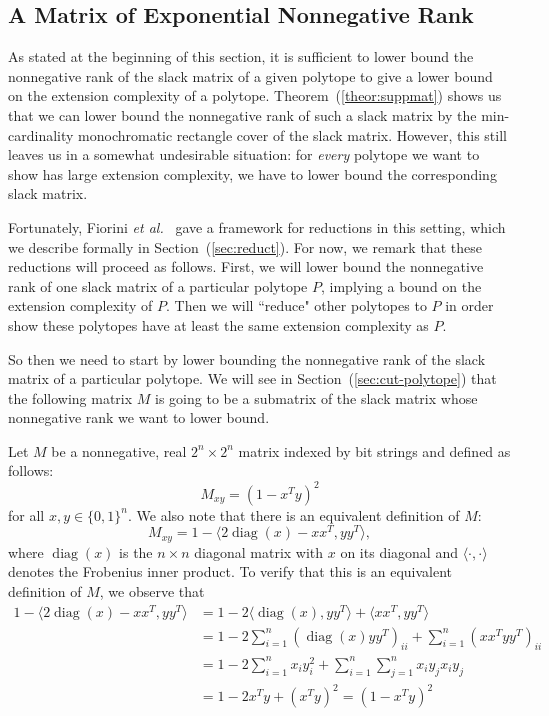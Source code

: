 \documentclass{article}
\makeatletter
\theoremstyle{definition}
\theoremstyle{remark}
\newcommand{\cetal}{\textit{et al.\@}}  %
\newcommand{\rank}{\operatorname{rank}}
\newcommand{\diag}{\operatorname{diag}}
\newcommand{\bits}{\{0,1\}}
\makeatother
\begin{document}

\subsection{A Matrix of Exponential Nonnegative Rank}\label{sec:rec-cover}

As stated at the beginning of this section, it is sufficient to lower bound the nonnegative rank of the slack matrix of a given polytope to give a lower bound on the extension complexity of a polytope. Theorem~(\ref{theor:suppmat}) shows us that we can lower bound the nonnegative rank of such a slack matrix by the min-cardinality monochromatic rectangle cover of the slack matrix. However, this still leaves us in a somewhat undesirable situation: for \emph{every} polytope we want to show has large extension complexity, we have to lower bound the corresponding slack matrix.

Fortunately, Fiorini \cetal~\cite{fiorini} gave a framework for reductions in this setting, which we describe formally in Section~(\ref{sec:reduct}). For now, we remark that these reductions will proceed as follows. First, we will lower bound the nonnegative rank of one slack matrix of a particular polytope $P$, implying a bound on the extension complexity of $P$. Then we will ``reduce" other polytopes to $P$ in order show these polytopes have at least the same extension complexity as $P$. 

So then we need to start by lower bounding the nonnegative rank of the slack matrix of a particular polytope. We will see in Section~(\ref{sec:cut-polytope}) that the following matrix $M$ is going to be a submatrix of the slack matrix whose nonnegative rank we want to lower bound.

Let $M$ be a nonnegative, real $2^n \times 2^n$ matrix indexed by bit strings and defined as follows:
\[
M_{xy} = {(1 - x^Ty)}^2
\]
for all $x,y \in \bits^n$. We also note that there is an equivalent definition of $M$:
\[
M_{xy} = 1 - \langle 2\diag(x) - xx^T, yy^T\rangle,
\]
where $\diag(x)$ is the $n \times n$ diagonal matrix with $x$ on its diagonal and $\langle\cdot, \cdot\rangle$ denotes the Frobenius inner product. To verify that this is an equivalent definition of $M$, we observe that
\begin{align*}
1 - \langle 2\diag(x) - xx^T, yy^T\rangle & = 1 - 2\langle\diag(x), yy^T\rangle + \langle xx^T, yy^T\rangle \\
& = 1 - 2 \sum_{i=1}^n (\diag(x)yy^T)_{ii} + \sum_{i=1}^n (xx^Tyy^T)_{ii}  \\
& = 1 - 2 \sum_{i=1}^n x_{i} y_{i}^2 + \sum_{i=1}^n \sum_{j=1}^n x_iy_jx_iy_j \\
& =  1 - 2 x^Ty + {(x^Ty)}^2 = {(1 - x^Ty)}^2
\end{align*}
\end{document}
